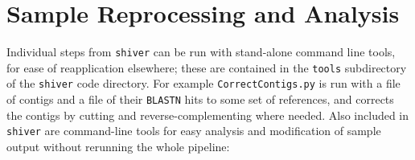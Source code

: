 \documentclass{article}
\newcommand{\shiv}{\texttt{shiver}\xspace}
\let\c\texttt
\begin{document}
\section{Sample Reprocessing and Analysis}
Individual steps from \shiv can be run with stand-alone command line tools, for ease of reapplication elsewhere; these are contained in the \c{tools} subdirectory of the \shiv code directory.
For example \texttt{CorrectContigs.py} is run with a file of contigs and a file of their \texttt{BLASTN} hits to some set of references, and corrects the contigs by cutting and reverse-complementing where needed.
Also included in \shiv are command-line tools for easy analysis and modification of sample output without rerunning the whole pipeline:
\end{document}
